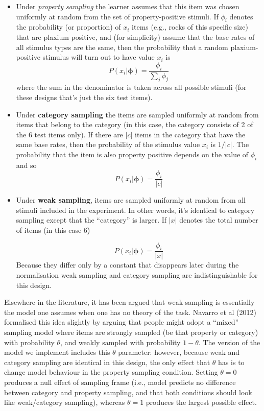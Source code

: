\documentclass[
  english,
  doc]{apa6}
\begin{document}
\begin{itemize}
\item
  Under \emph{property sampling} the learner assumes that this item was chosen uniformly at random from the set of property-positive stimuli. If \(\phi_i\) denotes the probability (or proportion) of \(x_i\) items (e.g., rocks of this specific size) that are plaxium positive, and (for simplicity) assume that the base rates of all stimulus types are the same, then the probability that a random plaxium-positive stimulus will turn out to have value \(x_i\) is
  \[
  P(x_i | \bm{\phi}) = \frac{\phi_i}{\sum_j \phi_j}
  \]
  where the sum in the denominator is taken across all possible stimuli (for these designs that's just the six test items).
\item
  Under \textbf{category sampling} the items are sampled uniformly at random from items that belong to the category (in this case, the category consists of 2 of the 6 test items only). If there are \(|c|\) items in the category that have the same base rates, then the probability of the stimulus value \(x_i\) is \(1/|c|\). The probability that the item is also property positive depends on the value of \(\phi_i\) and so
  \[
  P(x_i | \bm{\phi}) = \frac{\phi_i}{|c|}
  \]
\item
  Under \textbf{weak sampling}, items are sampled uniformly at random from all stimuli included in the experiment. In other words, it's identical to category sampling except that the \enquote{category} is larger. If \(|x|\) denotes the total number of items (in this case 6)

  \[
  P(x_i | \bm{\phi}) = \frac{\phi_i}{|x|}
  \]
  Because they differ only by a constant that disappears later during the normalisation weak sampling and category sampling are indistinguishable for this design.
\end{itemize}

\noindent
Elsewhere in the literature, it has been argued that weak sampling is essentially the model one assumes when one has no theory of the task. Navarro et al (2012) formalised this idea slightly by arguing that people might adopt a \enquote{mixed} sampling model where items are strongly sampled (be that property or category) with probability \(\theta\), and weakly sampled with probability \(1-\theta\). The version of the model we implement includes this \(\theta\) parameter: however, because weak and category sampling are identical in this design, the only effect that \(\theta\) has is to change model behaviour in the property sampling condition. Setting \(\theta = 0\) produces a null effect of sampling frame (i.e., model predicts no difference between category and property sampling, and that both conditions should look like weak/category sampling), whereas \(\theta = 1\) produces the largest possible effect.
\end{document}
